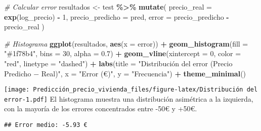 \documentclass[
]{article}
\newenvironment{Shaded}{\begin{snugshade}}{\end{snugshade}}
\newcommand{\AttributeTok}[1]{\textcolor[rgb]{0.13,0.29,0.53}{#1}}
\newcommand{\CommentTok}[1]{\textcolor[rgb]{0.56,0.35,0.01}{\textit{#1}}}
\newcommand{\DecValTok}[1]{\textcolor[rgb]{0.00,0.00,0.81}{#1}}
\newcommand{\FloatTok}[1]{\textcolor[rgb]{0.00,0.00,0.81}{#1}}
\newcommand{\FunctionTok}[1]{\textcolor[rgb]{0.13,0.29,0.53}{\textbf{#1}}}
\newcommand{\NormalTok}[1]{#1}
\newcommand{\OtherTok}[1]{\textcolor[rgb]{0.56,0.35,0.01}{#1}}
\newcommand{\SpecialCharTok}[1]{\textcolor[rgb]{0.81,0.36,0.00}{\textbf{#1}}}
\newcommand{\StringTok}[1]{\textcolor[rgb]{0.31,0.60,0.02}{#1}}
\begin{document}
\begin{Shaded}
\begin{Highlighting}[]
\CommentTok{\# Calcular error}
\NormalTok{resultados }\OtherTok{\textless{}{-}}\NormalTok{ test }\SpecialCharTok{\%\textgreater{}\%}
  \FunctionTok{mutate}\NormalTok{(}
    \AttributeTok{precio\_real =} \FunctionTok{exp}\NormalTok{(log\_precio) }\SpecialCharTok{{-}} \DecValTok{1}\NormalTok{,}
    \AttributeTok{precio\_predicho =}\NormalTok{ pred,}
    \AttributeTok{error =}\NormalTok{ precio\_predicho }\SpecialCharTok{{-}}\NormalTok{ precio\_real}
\NormalTok{  )}

\CommentTok{\# Histograma}
\FunctionTok{ggplot}\NormalTok{(resultados, }\FunctionTok{aes}\NormalTok{(}\AttributeTok{x =}\NormalTok{ error)) }\SpecialCharTok{+}
  \FunctionTok{geom\_histogram}\NormalTok{(}\AttributeTok{fill =} \StringTok{"\#1f78b4"}\NormalTok{, }\AttributeTok{bins =} \DecValTok{30}\NormalTok{, }\AttributeTok{alpha =} \FloatTok{0.7}\NormalTok{) }\SpecialCharTok{+}
  \FunctionTok{geom\_vline}\NormalTok{(}\AttributeTok{xintercept =} \DecValTok{0}\NormalTok{, }\AttributeTok{color =} \StringTok{"red"}\NormalTok{, }\AttributeTok{linetype =} \StringTok{"dashed"}\NormalTok{) }\SpecialCharTok{+}
  \FunctionTok{labs}\NormalTok{(}\AttributeTok{title =} \StringTok{"Distribución del error (Precio Predicho − Real)"}\NormalTok{,}
       \AttributeTok{x =} \StringTok{"Error (€)"}\NormalTok{, }\AttributeTok{y =} \StringTok{"Frecuencia"}\NormalTok{) }\SpecialCharTok{+}
  \FunctionTok{theme\_minimal}\NormalTok{()}
\end{Highlighting}
\end{Shaded}

\texttt{[image: Predicción\_precio\_vivienda\_files/figure-latex/Distribución del error-1.pdf]}
El histograma muestra una distribución asimétrica a la izquierda, con la
mayoría de los errores concentrados entre -50€ y +50€.

\begin{Shaded}
\end{Shaded}

\begin{verbatim}
## Error medio: -5.93 €
\end{verbatim}
\end{document}

